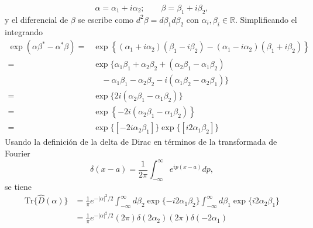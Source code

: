 \begin{enumerate}
        \begin{equation}
          \alpha = \alpha_1 + i\alpha_2;\qquad \beta = \beta_1 + i\beta_2,
        \end{equation}
        y el diferencial de $\beta$ se escribe como $d^2\beta = d\beta_1 d\beta_2$ con $\alpha_i, \beta_i \in \mathbb{R}$. Simplificando el integrando
        \begin{align}
          \exp(\alpha\beta^* - \alpha^*\beta) = & \exp\left\{ (\alpha_1 + i\alpha_2)(\beta_1 - i\beta_2) - (\alpha_1 - i\alpha_2)(\beta_1 + i\beta_2) \right\}                                                          \nonumber \\
          =                                     & \exp\{\alpha_1\beta_1 + \alpha_2\beta_2 + (\alpha_2\beta_1 - \alpha_1\beta_2)                                                                                                   \\ &\quad - \alpha_1\beta_1 - \alpha_2\beta_2 - i(\alpha_1\beta_2 - \alpha_2\beta_1)\} \nonumber \\
          =                                     & \exp\{ 2i(\alpha_2\beta_1 - \alpha_1\beta_2) \}                                                                                                                       \nonumber \\
          =                                     & \exp\left\{ -2i(\alpha_{2}\beta_{1} - \alpha_{1}\beta_{2}) \right\}                                                                                                  \nonumber  \\
          =                                     & \exp\{[-2i\alpha_2\beta_1]\}\exp\{[i2\alpha_1\beta_2]\}
        \end{align}
        Usando la definición de la delta de Dirac en términos de la transformada de Fourier
        \begin{equation}
          \delta(x-a) = \frac{1}{2\pi} \int_{-\infty}^{\infty}e^{ip(x-a)}dp,
        \end{equation}
        se tiene
        \begin{align}
          \mathrm{Tr}\{\hat{D}(\alpha)\} & = \frac{1}{\pi}e^{-|\alpha|^2/2}\int_{-\infty}^{\infty}d\beta_2 \exp{\{-i2\alpha_1\beta_2\}}\int_{-\infty}^{\infty}d\beta_1 \exp{\{i2\alpha_2\beta_1\}} \nonumber \\
                                         & = \frac{1}{\pi} e^{-|\alpha|^2/2}(2\pi)\delta(2\alpha_2)(2\pi)\delta(-2\alpha_1)                                                                       \nonumber  \\

\end{align}
\end{enumerate}
